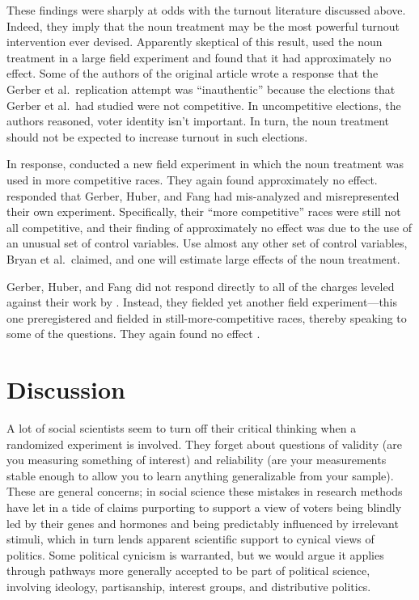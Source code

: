 \documentclass[11pt,letterpaper]{article}
\begin{document}
These findings were sharply at odds with the turnout literature discussed above.
Indeed, they imply that the noun treatment may be the most powerful turnout
intervention ever devised. Apparently skeptical of this result,
\citet{gerber2016} used the noun treatment in a large field experiment and found
that it had approximately no effect. Some of the authors of the original article
wrote a response that the Gerber et al.\ replication attempt was
``inauthentic'' because the elections that Gerber et al.\ had studied were not
competitive. In uncompetitive elections, the authors reasoned, voter identity
isn't important. In turn, the noun treatment should not be expected to increase
turnout in such elections.

In response, \citet*{gerber2018} conducted a new field experiment in which the
noun treatment was used in more competitive races. They again found
approximately no effect. \citet*{bryan2019} responded that Gerber, Huber, and
Fang had mis-analyzed and misrepresented their own experiment. Specifically,
their ``more competitive'' races were still not all competitive, and their
finding of approximately no effect was due to the use of an unusual set of
control variables. Use almost any other set of control variables, Bryan et al.\
claimed, and one will estimate large effects of the noun treatment.

Gerber, Huber, and Fang did not respond directly to all of the charges leveled
against their work by \citet*{bryan2019}. Instead, they fielded yet another
field experiment---this one preregistered and fielded in still-more-competitive
races, thereby speaking to some of the questions. They again found no effect
\citep*{gerber2020}.

\section{Discussion}

A lot of social scientists seem to turn off their critical thinking when a
randomized experiment is involved. They forget about questions of validity (are
you measuring something of interest) and reliability (are your measurements
stable enough to allow you to learn anything generalizable from your sample).
These are general concerns; in social science these mistakes in research methods
have let in a tide of claims purporting to support a view of voters being
blindly led by their genes and hormones and being predictably influenced by
irrelevant stimuli, which in turn lends apparent scientific support to cynical
views of politics. Some political cynicism is warranted, but we would argue it
applies through pathways more generally accepted to be part of political
science, involving ideology, partisanship, interest groups, and distributive
politics.
\end{document}
